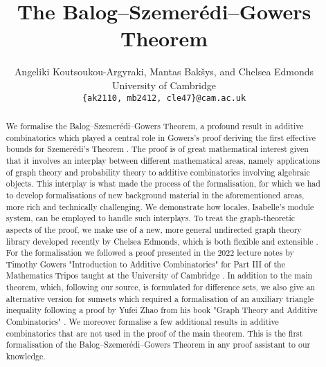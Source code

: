 \documentclass[11pt,a4paper]{article}
\begin{document}
\title{The Balog--Szemer\'{e}di--Gowers Theorem}
\author{Angeliki Koutsoukou-Argyraki, Mantas Bak\v{s}ys, and Chelsea Edmonds\\
University of Cambridge\\
\texttt{\{ak2110, mb2412, cle47\}@cam.ac.uk}}

\maketitle

\begin{abstract}
We formalise the Balog--Szemer\'{e}di--Gowers Theorem,  a profound result in additive combinatorics  which played a central role in Gowers's  proof deriving the first effective bounds for Szemer\'{e}di's Theorem \cite{GowersnewSzemeredi}.
The proof is of great mathematical interest given that it involves an interplay between different mathematical areas, namely applications of graph theory and probability theory to additive combinatorics involving algebraic objects.
This interplay is what made the process of the formalisation, for which we had to develop formalisations of new background material in the aforementioned areas, more rich and technically challenging.  We demonstrate how locales, Isabelle's module system, can be employed to handle such interplays.
To treat the graph-theoretic aspects of the
proof, we make use of a new, more general undirected graph theory library developed recently by Chelsea Edmonds, which is both flexible and extensible \cite{Undirected_Graph_Theory-AFP}.
For the formalisation we followed a proof presented in the 2022 lecture notes by Timothy 
Gowers "Introduction to Additive Combinatorics"  for Part III of the Mathematics Tripos taught at the University of Cambridge \cite{Gowersnotes}.
 In addition to the main theorem, which, following our source, is formulated for difference sets, we 
also give an alternative version for sumsets which required a formalisation of an auxiliary triangle inequality
following a proof by Yufei Zhao from his book "Graph Theory and Additive 
Combinatorics" \cite{Zhaobook}.
We moreover formalise a few 
additional results  in additive combinatorics that are not used in the proof of the main theorem. 
This is the first formalisation of the Balog--Szemer\'{e}di--Gowers Theorem in any proof assistant to our knowledge. 

\end{abstract}
\newpage
\tableofcontents
\end{document}
